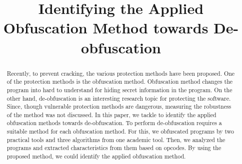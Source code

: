 \documentclass[conference]{IEEEtran}
\begin{document}
\title{Identifying the Applied Obfuscation Method towards De-obfuscation}

\author{
\and
{}
}

\maketitle

\begin{abstract}
  Recently, to prevent cracking, the various protection methods have
  been proposed.  One of the protection methods is the obfuscation
  method. Obfuscation method changes the program into hard to understand
  for hiding secret information in the program.
  On the other hand, de-obfuscation is an interesting research topic
  for protecting the software.  Since, though vulnerable protection
  methods are dangerous, measuring the robustness of the method was not
  discussed.
  In this paper, we tackle to identify the applied obfuscation methods
  towards de-obfuscation.  To perform de-obfuscation requires a
  suitable method for each obfuscation method.  For this, we
  obfuscated programs by two practical tools and three algorithms from
  one academic tool.  Then, we analyzed the programs and extracted
  characteristics from them based on opcodes.  By using the proposed
  method, we could identify the applied obfuscation method.
\end{abstract}
\end{document}
